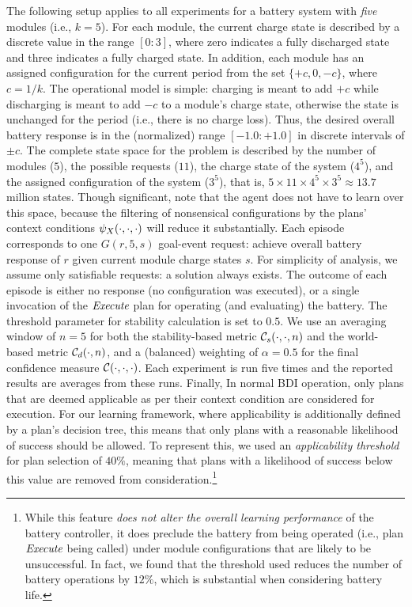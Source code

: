 The following setup applies to all experiments for a battery system with \emph{five} modules (i.e., $k=5$). For each module, the current charge state is described by a discrete value in the range $[0:3]$, where zero indicates a fully discharged state and three indicates a fully charged state. In addition, each module has an assigned configuration for the current period from the set $\{+c, 0, -c\}$, where $c=1/k$. The operational model is simple: charging is meant to add $+c$ while discharging is meant to add $-c$ to a module's charge state, otherwise the state is unchanged for the period (i.e., there is no charge loss). Thus, the desired overall battery response is in the (normalized) range $[-1.0:+1.0]$ in discrete intervals of $\pm c$. The complete state space for the problem is described by the number of modules ($5$), the possible requests ($11$), the charge state of the system ($4^5$), and the assigned configuration of the system ($3^5$), that is, $5 \times 11 \times 4^5 \times 3^5 \approx 13.7$ million states. Though significant, note that the agent does not have to learn over this space, because the filtering of nonsensical configurations by the plans' context conditions $\psi_X(\cdot,\cdot,\cdot)$ will reduce it substantially.
%
Each episode corresponds to one $G(r,5,s)$ goal-event request: achieve overall battery response of $r$ given current module charge states $s$.  For simplicity of analysis, we assume only satisfiable requests: a solution always exists. The outcome of each episode is either no response (no configuration was executed), or a single invocation of the $\operatorname{\textit{Execute}}$ plan for operating (and evaluating) the battery. The threshold parameter for stability calculation is set to $0.5$. We use an averaging window of $n=5$ for both the stability-based metric ${\mathcal{C}}_s(\cdot,\cdot,n)$ and the world-based metric ${\mathcal{C}}_d(\cdot,n)$, and a (balanced) weighting of $\alpha=0.5$ for the final confidence measure ${\mathcal{C}}(\cdot,\cdot,\cdot)$. Each experiment is run five times and the reported results are averages from these runs. Finally, 
%
In normal BDI operation, only plans that are deemed applicable as per their context condition are considered for execution. For our learning framework, where applicability is additionally defined by a plan's decision tree, this means that only plans with a reasonable likelihood of success should be allowed. To represent this, we used an \emph{applicability threshold} for plan selection of $40\%$, meaning that plans with a likelihood of success below this value are removed from consideration.\footnote{While this feature {\em does not alter the overall learning performance} of the battery controller, it does preclude the battery from being operated (i.e., plan $\operatorname{\textit{Execute}}$ being called) under module configurations that are likely to be unsuccessful. In fact, we found that the threshold used reduces the number of battery operations by $12\%$, which is substantial when considering battery life.}



